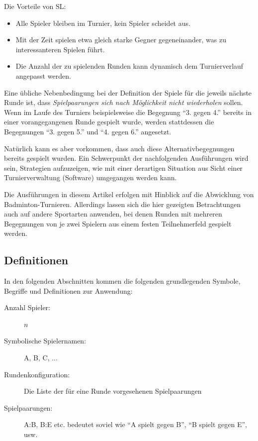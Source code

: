 \documentclass[DIV=15, 10pt]{scrartcl}
\begin{document}
Die Vorteile von SL:

\begin{itemize}

\item Alle Spieler bleiben im Turnier, kein Spieler scheidet aus.

\item Mit der Zeit spielen etwa gleich starke Gegner gegeneinander, was zu interessanteren Spielen führt.

\item Die Anzahl der zu spielenden Runden kann dynamisch dem Turnierverlauf angepasst werden.

\end{itemize}

Eine übliche Nebenbedingung bei der Definition der Spiele für die jeweils nächste Runde ist, dass \emph{Spielpaarungen sich nach Möglichkeit nicht wiederholen} sollen. Wenn im Laufe des Turniers beispielsweise die Begegnung "`3. gegen 4."' bereits in einer vorangegangenen Runde gespielt wurde, werden stattdessen die Begegnungen "`3. gegen 5."' und "`4. gegen 6."' angesetzt.

Natürlich kann es aber vorkommen, dass auch diese Alternativbegegnungen bereits gespielt wurden. Ein Schwerpunkt der nachfolgenden Ausführungen wird sein, Strategien aufzuzeigen, wie mit einer derartigen Situation aus Sicht einer Turnierverwaltung (Software) umgegangen werden kann.

Die Ausführungen in diesem Artikel erfolgen mit Hinblick auf die Abwicklung von Badminton-Turnieren. Allerdings lassen sich die hier gezeigten Betrachtungen auch auf andere Sportarten anwenden, bei denen Runden mit mehreren Begegnungen von je zwei Spielern aus einem festen Teilnehmerfeld gespielt werden.

\subsection{Definitionen}

In den folgenden Abschnitten kommen die folgenden grundlegenden Symbole, Begriffe und Definitionen zur Anwendung:

\begin{description}

\item[Anzahl Spieler:] $n$

\item[Symbolische Spielernamen:] A, B, C, ...

\item[Rundenkonfiguration:] Die Liste der für eine Runde vorgesehenen Spielpaarungen

\item[Spielpaarungen:] A:B, B:E etc. bedeutet soviel wie "`A spielt gegen B"', "`B spielt gegen E"', usw.

\end{description}
\end{document}
